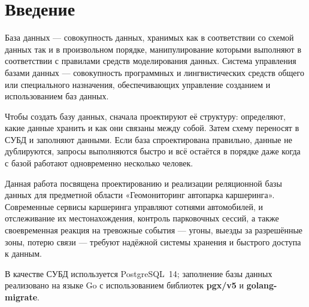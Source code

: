 
\section*{Введение}

База данных — совокупность данных, хранимых как в соответствии со схемой данных так и в произвольном порядке, манипулирование которыми выполняют в соответствии с правилами средств моделирования данных.
Система управления базами данных — совокупность программных и лингвистических средств общего или специального назначения, обеспечивающих управление созданием и использованием баз данных.

Чтобы создать базу данных, сначала проектируют её структуру: определяют,
какие данные хранить и как они связаны между собой. Затем схему переносят
в СУБД и заполняют данными. Если база спроектирована правильно, данные
не дублируются, запросы выполняются быстро и всё остаётся в порядке
даже когда с базой работают одновременно несколько человек.

Данная работа посвящена проектированию и реализации реляционной базы
данных для предметной области «Геомониторинг автопарка каршеринга».
Современные сервисы каршеринга управляют сотнями автомобилей, и отслеживание их местонахождения, контроль парковочных сессий,
а также своевременная реакция на тревожные события — угоны, выезды
за разрешённые зоны, потерю связи — требуют надёжной системы хранения
и быстрого доступа к данным.

В качестве СУБД используется PostgreSQL~14; заполнение базы данных
реализовано на языке Go с использованием библиотек \textbf{pgx/v5}
и \textbf{golang-migrate}.
